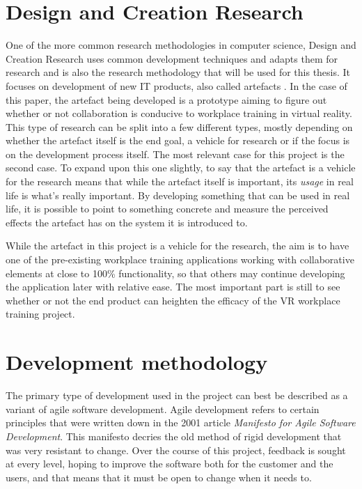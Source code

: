 \section{Design and Creation Research}
\label{sec:designCreationResearch}
One of the more common research methodologies in computer science, Design and Creation Research uses common development techniques and adapts them for research and is also the research methodology that will be used for this thesis. It focuses on development of new IT products, also called artefacts \cite{oates2005researching}. In the case of this paper, the artefact being developed is a prototype aiming to figure out whether or not collaboration is conducive to workplace training in virtual reality. This type of research can be split into a few different types, mostly depending on whether the artefact itself is the end goal, a vehicle for research or if the focus is on the development process itself. The most relevant case for this project is the second case. To expand upon this one slightly, to say that the artefact is a vehicle for the research means that while the artefact itself is important, its \textit{usage} in real life is what's really important. By developing something that can be used in real life, it is possible to point to something concrete and measure the perceived effects the artefact has on the system it is introduced to.

While the artefact in this project is a vehicle for the research, the aim is to have one of the pre-existing workplace training applications working with collaborative elements at close to 100\% functionality, so that others may continue developing the application later with relative ease. The most important part is still to see whether or not the end product can heighten the efficacy of the VR workplace training project.


\section{Development methodology}
The primary type of development used in the project can best be described as a variant of agile software development. Agile development refers to certain principles that were written down in the 2001 article \textit{Manifesto for Agile Software Development}\cite{beck2001manifesto}. This manifesto decries the old method of rigid development that was very resistant to change. Over the course of this project, feedback is sought at every level, hoping to improve the software both for the customer and the users, and that means that it must be open to change when it needs to.


